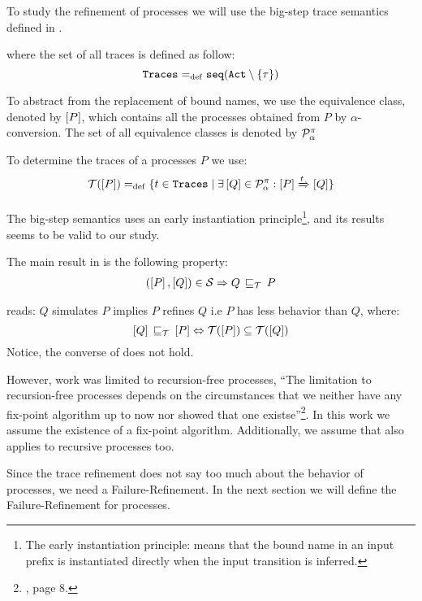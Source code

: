 To study the refinement of \picalc{} processes we will use the big-step trace semantics defined in \cite{gieseking}. 

 where the set of all traces is defined as follow:
\[\tr \define \seqset{\actions\setminus\set{\tau}}\]

To abstract from the replacement of bound names, we use the equivalence class, denoted by $\left[P\right]$, which contains all the processes obtained from $P$ by $\alpha$-conversion. The set of all equivalence classes is denoted by $\mathcal P^{\pi}_\alpha$ 

To determine the traces of a processes $P$ we use:
\begin{align}
    \traces[P] \define \{t\in \tr \mid \exists \ec{Q}\in\procsApha: \ec{P} \bigstep{t} \ec{Q}\}
\label{determine_trace}
\end{align}

The big-step semantics uses an early instantiation principle\footnote{The early instantiation principle: means that the bound name in an input prefix is instantiated directly when the input transition is inferred.}, and its results seems to be valid to our study.

The main result in \cite{gieseking} is the following property:
\begin{align}
    (\ec{P},\ec{Q})\in{}\simu \Rightarrow Q \refi P \label{property1}
\end{align}

 reads: $Q$ simulates $P$ implies $P$ refines $Q$ i.e $P$ has less behavior than $Q$, where:
\[\ec{Q}\refi \ec{P} \Leftrightarrow \traces[P]\subseteq\traces[Q]\]
Notice, the converse of  does not hold.

However, \cite{gieseking} work was limited to recursion-free processes, ``The limitation to recursion-free processes depends on the circumstances that we neither have any fix-point algorithm up to now nor showed that one existse''\footnote{\cite{gieseking}, page $8$.}. In this work we assume the existence of a fix-point algorithm. Additionally, we assume that  also applies to recursive processes too.

Since the trace refinement does not say too much about the behavior of processes, we need a Failure-Refinement. In the next section we will define the Failure-Refinement for \picalc{} processes.